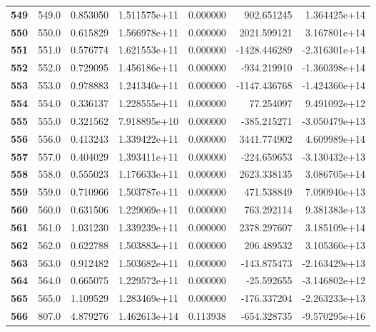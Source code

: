 \documentclass{report}[12pt]
\begin{document}
\begin{center}
\begin{tabular}{lrrrrrr}
\textbf{549 } &          549.0 &   0.853050 &  1.511575e+11 &    0.000000 &   902.651245 &  1.364425e+14 \\
\textbf{550 } &          550.0 &   0.615829 &  1.566978e+11 &    0.000000 &  2021.599121 &  3.167801e+14 \\
\textbf{551 } &          551.0 &   0.576774 &  1.621553e+11 &    0.000000 & -1428.446289 & -2.316301e+14 \\
\textbf{552 } &          552.0 &   0.729095 &  1.456186e+11 &    0.000000 &  -934.219910 & -1.360398e+14 \\
\textbf{553 } &          553.0 &   0.978883 &  1.241340e+11 &    0.000000 & -1147.436768 & -1.424360e+14 \\
\textbf{554 } &          554.0 &   0.336137 &  1.228555e+11 &    0.000000 &    77.254097 &  9.491092e+12 \\
\textbf{555 } &          555.0 &   0.321562 &  7.918895e+10 &    0.000000 &  -385.215271 & -3.050479e+13 \\
\textbf{556 } &          556.0 &   0.413243 &  1.339422e+11 &    0.000000 &  3441.774902 &  4.609989e+14 \\
\textbf{557 } &          557.0 &   0.404029 &  1.393411e+11 &    0.000000 &  -224.659653 & -3.130432e+13 \\
\textbf{558 } &          558.0 &   0.555023 &  1.176633e+11 &    0.000000 &  2623.338135 &  3.086705e+14 \\
\textbf{559 } &          559.0 &   0.710966 &  1.503787e+11 &    0.000000 &   471.538849 &  7.090940e+13 \\
\textbf{560 } &          560.0 &   0.631506 &  1.229069e+11 &    0.000000 &   763.292114 &  9.381383e+13 \\
\textbf{561 } &          561.0 &   1.031230 &  1.339239e+11 &    0.000000 &  2378.297607 &  3.185109e+14 \\
\textbf{562 } &          562.0 &   0.622788 &  1.503883e+11 &    0.000000 &   206.489532 &  3.105360e+13 \\
\textbf{563 } &          563.0 &   0.912482 &  1.503682e+11 &    0.000000 &  -143.875473 & -2.163429e+13 \\
\textbf{564 } &          564.0 &   0.665075 &  1.229572e+11 &    0.000000 &   -25.592655 & -3.146802e+12 \\
\textbf{565 } &          565.0 &   1.109529 &  1.283469e+11 &    0.000000 &  -176.337204 & -2.263233e+13 \\
\textbf{566 } &          807.0 &   4.879276 &  1.462613e+14 &    0.113938 &  -654.328735 & -9.570295e+16 \\

\end{tabular}
\end{center}
\end{document}
